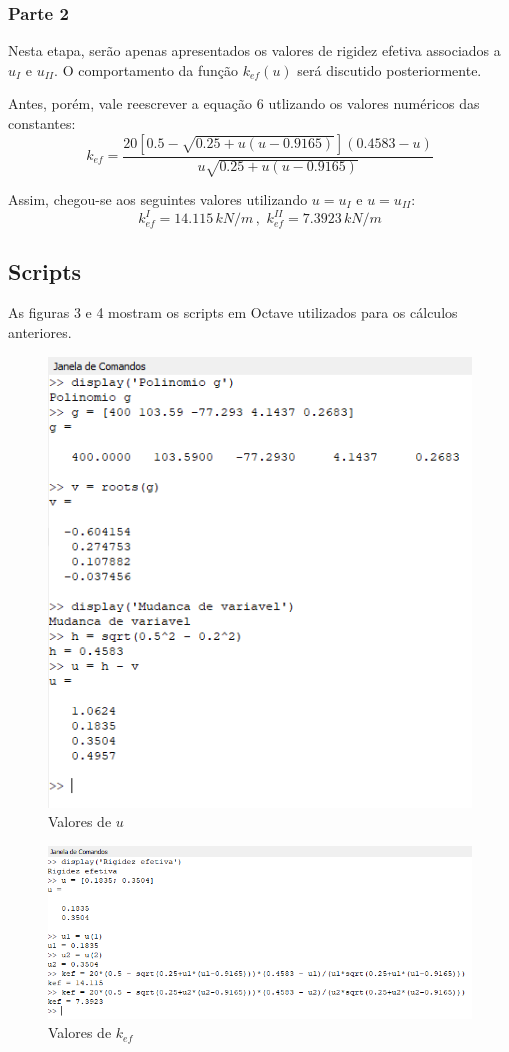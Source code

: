 \documentclass[a4paper, 12pt]{article}
\begin{document}
	\subsubsection{Parte 2}
	
	Nesta etapa, serão apenas apresentados os valores de rigidez efetiva associados a $u_I$ e $u_{II}$. O comportamento
	da função $k_{ef}(u)$ será discutido posteriormente.
	
	Antes, porém, vale reescrever a equação 6 utlizando os valores numéricos das constantes:
	$$k_{ef}=\frac{20[0.5-\sqrt{0.25+u(u-0.9165)}](0.4583-u)}{u\sqrt{0.25+u(u-0.9165)}}$$
	
	Assim, chegou-se aos seguintes valores utilizando $u=u_I$ e $u=u_{II}$: 
	$$k_{ef}^{I}=14.115\,kN/m\,,\,\,k_{ef}^{II}=7.3923\,kN/m$$ 
			
	\subsection{Scripts}
	
	As figuras 3 e 4 mostram os scripts em Octave utilizados para os cálculos anteriores.
	
	\begin{figure}[!htb]
		\centering
		\includegraphics[scale=0.7]{img1.png}
		\caption{Valores de $u$}
	\end{figure}
	
	\begin{figure}[!htb]
		\centering
		\includegraphics[scale=0.7]{img2.png}
		\caption{Valores de $k_{ef}$}
	\end{figure}
	
\end{document}
